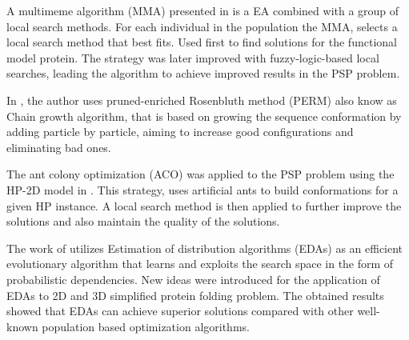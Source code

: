 \documentclass[conference]{IEEEtran}
\begin{document}
%



A multimeme algorithm (MMA) presented in \cite{krasnogor2002multimeme} is a EA combined with a
group of local search methods. For each individual in the population the MMA, selects a local search method that best fits. Used first to find solutions for the functional model protein. The strategy was later improved with fuzzy-logic-based local searches, leading the algorithm to achieve improved results in the PSP problem.







In \cite{hsu2003growth}, the author uses  pruned-enriched Rosenbluth method (PERM) also know as Chain growth algorithm, that is based on growing the sequence conformation by adding particle by particle, aiming to increase good configurations and eliminating bad ones.


The ant colony optimization (ACO) was applied to the PSP problem using the HP-2D model in \cite{shmygelska2002ant, shmygelska2003improved}. This strategy, uses artificial ants to build conformations for a given HP instance. A local search method is then applied to further improve the solutions and also maintain the quality of the solutions.

The work of \cite{santana2008protein} utilizes Estimation of distribution algorithms (EDAs) as an efficient evolutionary algorithm that learns and exploits the search space in the form of probabilistic dependencies. New ideas were introduced 
for the application of EDAs to 2D and 3D simplified protein folding problem. The obtained results showed that EDAs can achieve superior solutions compared with other well-known population based optimization algorithms.



\end{document}
